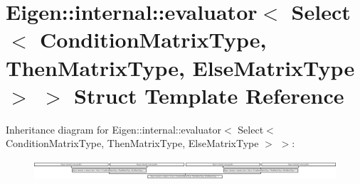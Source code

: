 \hypertarget{struct_eigen_1_1internal_1_1evaluator_3_01_select_3_01_condition_matrix_type_00_01_then_matrix_t0c555ecce04e199df0b1ebada3749ccc}{}\section{Eigen\+:\+:internal\+:\+:evaluator$<$ Select$<$ Condition\+Matrix\+Type, Then\+Matrix\+Type, Else\+Matrix\+Type $>$ $>$ Struct Template Reference}
\label{struct_eigen_1_1internal_1_1evaluator_3_01_select_3_01_condition_matrix_type_00_01_then_matrix_t0c555ecce04e199df0b1ebada3749ccc}
Inheritance diagram for Eigen\+:\+:internal\+:\+:evaluator$<$ Select$<$ Condition\+Matrix\+Type, Then\+Matrix\+Type, Else\+Matrix\+Type $>$ $>$\+:\begin{figure}[H]
\begin{center}
\leavevmode
\includegraphics[height=0.714286cm]{struct_eigen_1_1internal_1_1evaluator_3_01_select_3_01_condition_matrix_type_00_01_then_matrix_t0c555ecce04e199df0b1ebada3749ccc}
\end{center}
\end{figure}
